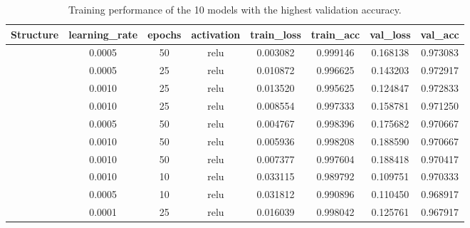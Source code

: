 \documentclass[a4paper]{article}
\begin{document}
\begin{table}[h!]
    \centering
    \caption{Training performance of the 10 models with the highest validation accuracy.}
    \label{tab:ann_performance_top10_validation_accuracy}
    \begin{tabular}{|| c c c c | c c c c ||}
  
    \hline
    \centering
    \textbf{Structure}  &\textbf{learning\_rate} &\textbf{epochs}    &\textbf{activation}    & \textbf{train\_loss}   &\textbf{train\_acc} &\textbf{val\_loss}  &\textbf{val\_acc} \\
    \hline \hline
    [64,32,16]          & 0.0005                & 50                & relu                  & 0.003082              & 0.999146          &0.168138           & 0.973083 \\ 
    \hline
    [64,32,16]          & 0.0005                & 25                & relu                  & 0.010872              & 0.996625          &0.143203           & 0.972917 \\ 
    \hline
    [64,32,16]          & 0.0010                & 25                & relu                  & 0.013520              & 0.995625          &0.124847           & 0.972833 \\ 
    \hline
    [64,32]             & 0.0010                & 25                & relu                  & 0.008554              & 0.997333          &0.158781           & 0.971250 \\ 
    \hline
    [64,32]             & 0.0005                & 50                & relu                  & 0.004767              & 0.998396          &0.175682           & 0.970667 \\ 
    \hline
    [64,32]             & 0.0010                & 50                & relu                  & 0.005936              & 0.998208          &0.188590           & 0.970667 \\ 
    \hline
    [64,32,16]          & 0.0010                & 50                & relu                  & 0.007377              & 0.997604          &0.188418           & 0.970417 \\ 
    \hline
    [64,32]             & 0.0010                & 10                & relu                  & 0.033115              & 0.989792          &0.109751           & 0.970333 \\ 
    \hline
    [64,32]             & 0.0005                & 10                & relu                  & 0.031812              & 0.990896          &0.110450           & 0.968917 \\ 
    \hline
    [64,32]             & 0.0001                & 25                & relu                  & 0.016039              & 0.998042          &0.125761           & 0.967917 \\ 
    \hline
    \end{tabular}
\end{table}
\end{document}
